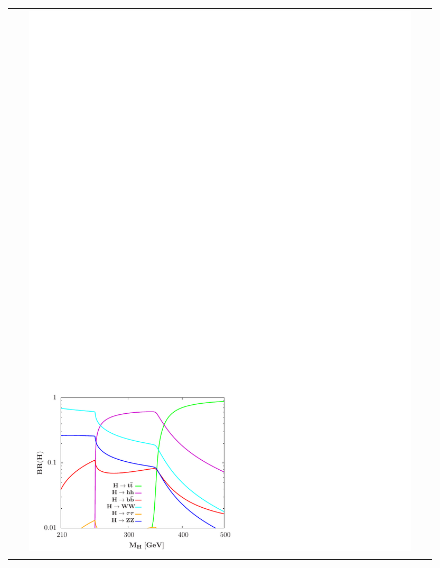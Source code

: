 \begin{figure}[htp]
\begin{tabular}{ccc}
& \hspace{-0.65cm} \includegraphics[trim={0.0cm 0cm 9.5cm 21cm},clip, scale=0.58]{fig/sm_beyond/H_br.pdf}

\end{tabular}
\end{figure}
